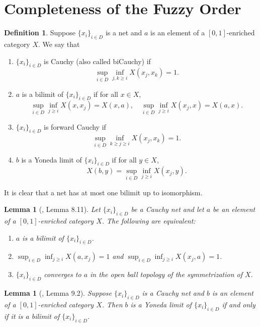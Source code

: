 \documentclass[preprint,3p,times]{elsarticle}
\theoremstyle{plain}
\newtheorem{lem}[thm]{Lemma}
\theoremstyle{definition}
\newtheorem{definition}[thm]{Definition}
\numberwithin{equation}{section}
\begin{document}
\section{Completeness of the Fuzzy Order}
\begin{definition}
    Suppose $\{x_i\}_{i\in D}$ is a net and $a$ is an element of a \([0,1]\)-enriched category $X$. We say that
\begin{enumerate}[label={\textup{(\arabic*)}}]
    \item $\{x_i\}_{i\in D}$ is Cauchy (also called biCauchy) if
    \[
    \sup_{i\in D}\inf_{j,k\geq i} X(x_j,x_k) = 1.
    \]
    \item $a$ is a bilimit of $\{x_i\}_{i\in D}$ if for all $x\in X$,
    \[
    \sup_{i\in D}\inf_{j\geq i} X(x,x_j) = X(x,a), \quad \sup_{i\in D}\inf_{j\geq i} X(x_j,x) = X(a,x).
    \]
    \item  $\{x_i\}_{i \in D}$ is forward Cauchy if
		\[
		\sup_{i \in D} \inf_{k \geq j \geq i} X(x_j, x_k) = 1.
		\]
	\item  $b$ is a Yoneda limit of $\{x_i\}_{i \in D}$ if for all $y \in X$,
		\[
		X(b, y) = \sup_{i \in D} \inf_{j\ge i} X(x_j, y).
		\]
\end{enumerate}
It is clear that a net has at most one bilimit up to isomorphism.
\end{definition}
\begin{lem}[\cite{Zhang2024IntroductoryNO}, Lemma 8.11]\label{lem:bilimit}
    Let $\{x_i\}_{i\in D}$ be a Cauchy net and let $a$ be an element of a \([0,1]\)-enriched category $X$. The following are equivalent:
\begin{enumerate} [label={\textup{(\arabic*)}}]
    \item $a$ is a bilimit of $\{x_i\}_{i\in D}$.
    \item $\sup_{i\in D}\inf_{j\geq i} X(a,x_j) = 1$ and $\sup_{i\in D}\inf_{j\geq i} X(x_j,a) = 1$.
    \item $\{x_i\}_{i\in D}$ converges to $a$ in the open ball topology of the symmetrization of $X$.
\end{enumerate}
\end{lem}
\begin{lem}[\cite{Zhang2024IntroductoryNO}, Lemma 9.2]\label{lem:yoneda limit is bilimit}
    Suppose $\{x_i\}_{i \in D}$ is a Cauchy net and $b$ is an element of a \([0,1]\)-enriched category $X$. Then $b$ is a Yoneda limit of $\{x_i\}_{i \in D}$ if and only if it is a bilimit of $\{x_i\}_{i \in D}$.
\end{lem}
\end{document}
